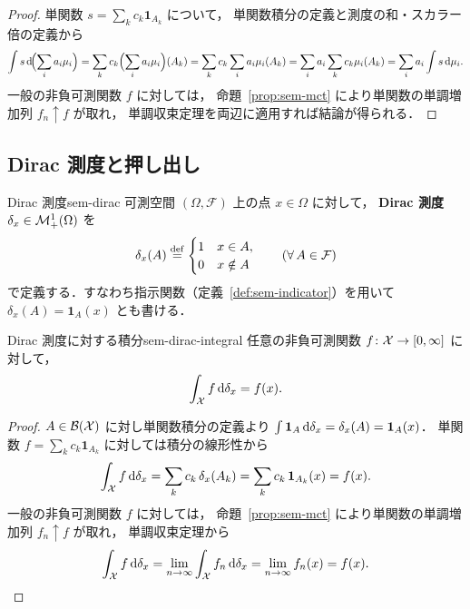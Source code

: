 \begin{proof}
  単関数 $s = \sum_{k} c_k \mathbf{1}_{A_k}$ について，
  単関数積分の定義と測度の和・スカラー倍の定義から
  \[
    \int s \, \mathrm{d}\!\Bigl(\sum_i a_i \mu_i\Bigr)
    = \sum_k c_k \Bigl(\sum_i a_i \mu_i\Bigr)(A_k)
    = \sum_k c_k \sum_i a_i \mu_i(A_k)
    = \sum_i a_i \sum_k c_k \mu_i(A_k)
    = \sum_i a_i \int s \, \mathrm{d}\mu_i.
  \]
  一般の非負可測関数 $f$ に対しては，
  命題~\ref{prop:sem-mct} により単関数の単調増加列 $f_n \uparrow f$ が取れ，
  単調収束定理を両辺に適用すれば結論が得られる．
\end{proof}

\subsection{Dirac 測度と押し出し}
\label{sec:sem-dirac-pushforward}

\begin{definition}{Dirac 測度}{sem-dirac}
  可測空間 $(\Omega, \mathcal{F})$ 上の点 $x \in \Omega$ に対して，
  \textbf{Dirac 測度} $\delta_x \in \mathcal{M}_+^1(\Omega)$ を
  \[
    \delta_x(A) \overset{\mathrm{def}}{=}
    \begin{cases}
      1 & x \in A, \\
      0 & x \notin A
    \end{cases}
    \qquad (\forall\, A \in \mathcal{F})
  \]
  で定義する．すなわち指示関数（定義~\ref{def:sem-indicator}）を用いて
  $\delta_x(A) = \mathbf{1}_A(x)$ とも書ける．
\end{definition}

\begin{claim}{Dirac 測度に対する積分}{sem-dirac-integral}
  任意の非負可測関数 $f \colon \mathcal{X} \to [0, \infty]$ に対して，
  \[
    \int_{\mathcal{X}} f \, \mathrm{d}\delta_x = f(x).
  \]
\end{claim}

\begin{proof}
  $A \in \mathcal{B}(\mathcal{X})$ に対し単関数積分の定義より
  $\int \mathbf{1}_A \, \mathrm{d}\delta_x = \delta_x(A) = \mathbf{1}_A(x)$．
  単関数 $f = \sum_k c_k \mathbf{1}_{A_k}$ に対しては積分の線形性から
  \[
    \int_{\mathcal{X}} f \, \mathrm{d}\delta_x
    = \sum_k c_k \, \delta_x(A_k)
    = \sum_k c_k \, \mathbf{1}_{A_k}(x)
    = f(x).
  \]
  一般の非負可測関数 $f$ に対しては，
  命題~\ref{prop:sem-mct} により単関数の単調増加列 $f_n \uparrow f$ が取れ，
  単調収束定理から
  \[
    \int_{\mathcal{X}} f \, \mathrm{d}\delta_x
    = \lim_{n \to \infty} \int_{\mathcal{X}} f_n \, \mathrm{d}\delta_x
    = \lim_{n \to \infty} f_n(x)
    = f(x).
  \]
\end{proof}

